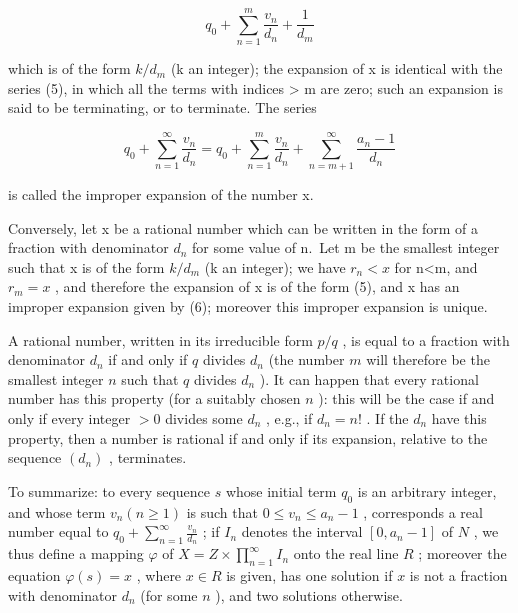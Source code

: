 \[
q _ {0} + \sum_ {n = 1} ^ {m} \frac {v _ {n}}{d _ {n}} + \frac {1}{d _ {m}}\tag{5}
\]

which is of the form \(k/d_{m}\) (k an integer); the expansion of x is identical with the series (5), in which all the terms with indices \textgreater{} m are zero; such an expansion is said to be terminating, or to terminate. The series

\[
q _ {0} + \sum_ {n = 1} ^ {\infty} \frac {v _ {n}}{d _ {n}} = q _ {0} + \sum_ {n = 1} ^ {m} \frac {v _ {n}}{d _ {n}} + \sum_ {n = m + 1} ^ {\infty} \frac {a _ {n} - 1}{d _ {n}}\tag{6}
\]

is called the improper expansion of the number x.

Conversely, let x be a rational number which can be written in the form of a fraction with denominator \(d_{n}\) for some value of n.~Let m be the smallest integer such that x is of the form \(k/d_{m}\) (k an integer); we have \(r_{n}<x\) for n\textless m, and \(r_{m}=x\) , and therefore the expansion of x is of the form (5), and x has an improper expansion given by (6); moreover this improper expansion is unique.

A rational number, written in its irreducible form \(p / q\) , is equal to a fraction with denominator \(d_n\) if and only if \(q\) divides \(d_n\) (the number \(m\) will therefore be the smallest integer \(n\) such that \(q\) divides \(d_n\) ). It can happen that every rational number has this property (for a suitably chosen \(n\) ): this will be the case if and only if every integer \(> 0\) divides some \(d_n\) , e.g., if \(d_n = n!\) . If the \(d_n\) have this property, then a number is rational if and only if its expansion, relative to the sequence \((d_n)\) , terminates.

To summarize: to every sequence \(s\) whose initial term \(q_{0}\) is an arbitrary integer, and whose term \(v_{n}(n \geqslant 1)\) is such that \(0 \leqslant v_{n} \leqslant a_{n} - 1\) , corresponds a real number equal to \(q_{0} + \sum_{n=1}^{\infty} \frac{v_{n}}{d_{n}}\) ; if \(I_{n}\) denotes the interval \([0, a_{n} - 1]\) of \(N\) , we thus define a mapping \(\varphi\) of \(X = Z \times \prod_{n=1}^{\infty} I_{n}\) onto the real line \(R\) ; moreover the equation \(\varphi(s) = x\) , where \(x \in R\) is given, has one solution if \(x\) is not a fraction with denominator \(d_{n}\) (for some \(n\) ), and two solutions otherwise.

